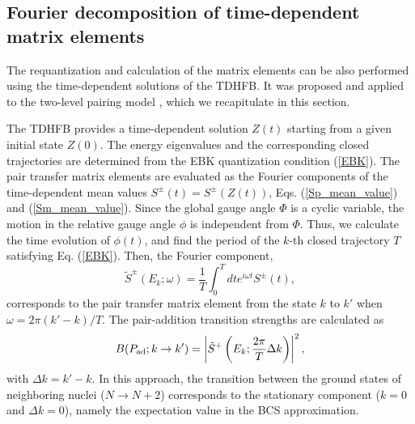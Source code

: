 \documentclass[%
superscriptaddress,
preprint,
showpacs,
nofootinbib,
amsmath,amssymb,
aps,
prc,
floatfix ]%
{revtex4-1}
\begin{document}
\subsection{Fourier decomposition of time-dependent matrix elements}
\label{sec:Fourier}

The requantization and calculation of the matrix elements can be also
performed using the time-dependent solutions of the TDHFB.
It was proposed and applied to the two-level pairing model \cite{CDS84},
which we recapitulate in this section.

The TDHFB provides a time-dependent solution $Z(t)$ starting from
a given initial state $Z(0)$.
The energy eigenvalues and the corresponding closed trajectories
are determined from the EBK quantization condition (\ref{EBK}).
The pair transfer matrix elements are evaluated as the Fourier components
of the time-dependent mean values $S^\pm(t)=S^\pm(Z(t))$,
Eqs. (\ref{Sp_mean_value}) and (\ref{Sm_mean_value}).
Since the global gauge angle $\Phi$ is a cyclic variable,
the motion in the relative gauge angle $\phi$ is independent from $\Phi$.
Thus, we calculate the time evolution of $\phi(t)$, and
find the period of the $k$-th closed trajectory $T$
satisfying Eq. (\ref{EBK}).
Then, the Fourier component,
\begin{equation}
	\tilde{S}^\pm(E_k; \omega) = \frac{1}{T}\int_0^T dt
	e^{i\omega t} S^\pm(t) ,
\label{Fourier_decomposition}
\end{equation}
corresponds to the pair transfer matrix element from the state $k$ to $k'$
when $\omega=2\pi (k'-k)/T$.
The pair-addition transition strengths are calculated as
\begin{equation}
	B(P_{\rm ad};k\rightarrow k') 
	= \left|\tilde{S}^+\left(E_k;\frac{2\pi}{T}\Delta k \right) \right|^2 ,
\end{equation}
with $\Delta k=k'-k$.
In this approach, the transition between the ground states of
neighboring nuclei ($N\rightarrow N+2$) corresponds to
the stationary component ($k=0$ and $\Delta k=0$),
namely the expectation value in the BCS approximation.
\end{document}
